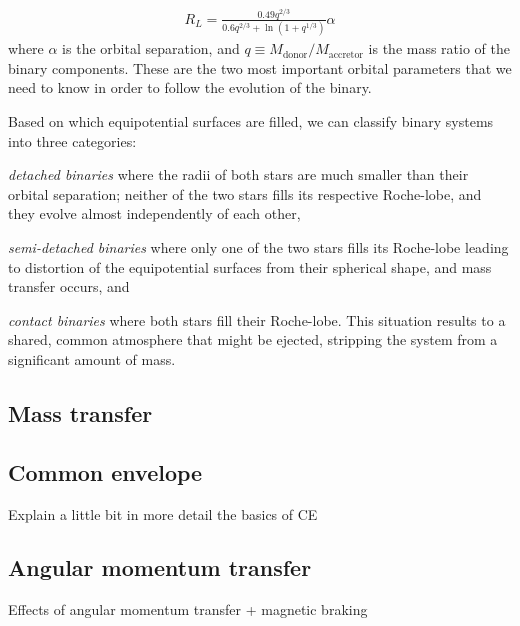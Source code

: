 \documentclass[../../main/thesis_msc.tex]{subfiles}
\begin{document}
				\begin{eqnarray}
					\label{eq:rl_radius}
					R_L = \frac{0.49 q^{2/3}}{0.6 q^{2/3} + \ln(1 + q^{1/3})} \alpha 
				\end{eqnarray}				 
				where $\alpha$ is the orbital separation, and $q \equiv M_{\text{donor}} / M_{\text{accretor}}$ is the mass ratio of the binary components. These are the two most important orbital parameters that we need to know in order to follow the evolution of the binary.
				
				Based on which equipotential surfaces are filled, we can classify binary systems into three categories:
					\begin{enumerate*}[label=(\roman*)]
						\item \emph{detached binaries} where the radii of both stars are much smaller than their orbital separation; neither of the two stars fills its respective Roche-lobe, and they evolve almost independently of each other,
						\item \emph{semi-detached binaries} where only one of the two stars fills its Roche-lobe leading to distortion of the equipotential surfaces from their spherical shape, and mass transfer occurs, and
						\item \emph{contact binaries} where both stars fill their Roche-lobe. This situation results to a shared, common atmosphere that might be ejected, stripping the system from a significant amount of mass.
					\end{enumerate*}									
				

					
			\subsection{Mass transfer}
			
				
			\subsection{Common envelope}
			
				Explain a little bit in more detail the basics of CE
				
			\subsection{Angular momentum transfer}
			
				Effects of angular momentum transfer + magnetic braking
				
\end{document}
